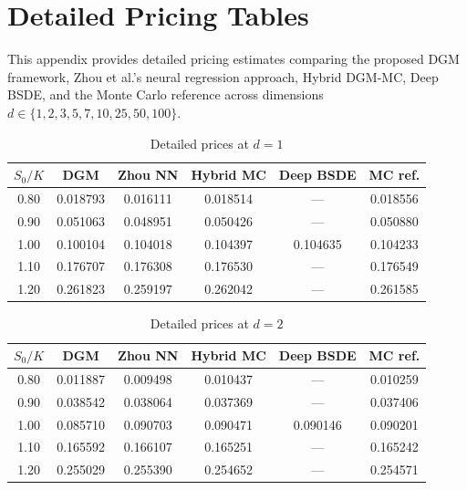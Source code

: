 \documentclass[12pt, a4paper]{article}
\begin{document}
\section{Detailed Pricing Tables}

This appendix provides detailed pricing estimates comparing the proposed DGM framework, Zhou et al.'s neural regression approach, Hybrid DGM-MC, Deep BSDE, and the Monte Carlo reference across dimensions $d \in \{1, 2, 3, 5, 7, 10, 25, 50, 100\}$.

\begin{table}[htpb]
    \centering
    \caption{Detailed prices at $d=1$}
    \label{tab:prices_d1}
    \begin{tabular}{|c|c|c|c|c|c|}
        \hline
        $S_0/K$ & DGM & Zhou NN & Hybrid MC & Deep BSDE & MC ref. \\
        \hline
        0.80 & 0.018793 & 0.016111 & 0.018514 & --- & 0.018556 \\
        0.90 & 0.051063 & 0.048951 & 0.050426 & --- & 0.050880 \\
        1.00 & 0.100104 & 0.104018 & 0.104397 & 0.104635 & 0.104233 \\
        1.10 & 0.176707 & 0.176308 & 0.176530 & --- & 0.176549 \\
        1.20 & 0.261823 & 0.259197 & 0.262042 & --- & 0.261585 \\
        \hline
    \end{tabular}
\end{table}

\begin{table}[htpb]
    \centering
    \caption{Detailed prices at $d=2$}
    \label{tab:prices_d2}
    \begin{tabular}{|c|c|c|c|c|c|}
        \hline
        $S_0/K$ & DGM & Zhou NN & Hybrid MC & Deep BSDE & MC ref. \\
        \hline
        0.80 & 0.011887 & 0.009498 & 0.010437 & --- & 0.010259 \\
        0.90 & 0.038542 & 0.038064 & 0.037369 & --- & 0.037406 \\
        1.00 & 0.085710 & 0.090703 & 0.090471 & 0.090146 & 0.090201 \\
        1.10 & 0.165592 & 0.166107 & 0.165251 & --- & 0.165242 \\
        1.20 & 0.255029 & 0.255390 & 0.254652 & --- & 0.254571 \\
        \hline
    \end{tabular}
\end{table}
\end{document}
